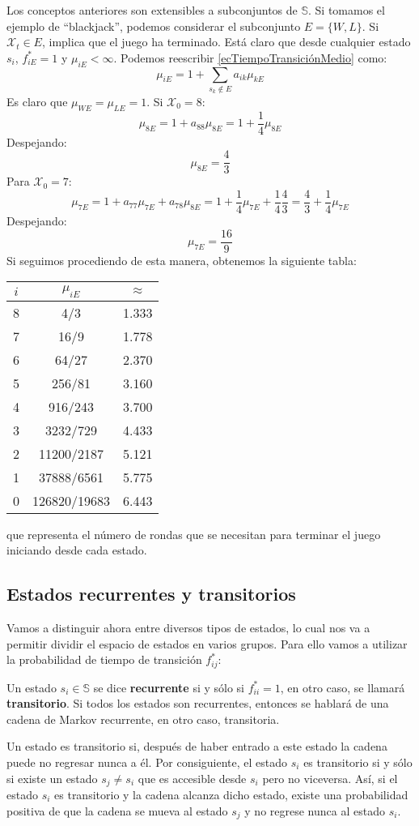 Los conceptos anteriores son extensibles a subconjuntos de $\mathbb{S}$. Si tomamos el ejemplo de \enquote{blackjack}, podemos considerar el subconjunto $E=\{W,L\}$. Si $\mathcal{X}_t\in E$, implica que el juego ha terminado. Está claro que desde cualquier estado $s_i$, $f_{iE}^*=1$ y $\mu_{iE}<\infty$. Podemos reescribir \eqref{ecTiempoTransiciónMedio} como:
\[\mu_{iE}=1+\sum_{s_k\notin E}a_{ik}\mu_{kE}\]
Es claro que $\mu_{WE}=\mu_{LE}=1$. Si $\mathcal{X}_0=8$:
\[\mu_{8E}=1+a_{88}\mu_{8E}=1+\dfrac{1}{4}\mu_{8E}\]
Despejando:
\[\mu_{8E}=\dfrac{4}{3}\]
Para $\mathcal{X}_0=7$:
\[\mu_{7E}=1+a_{77}\mu_{7E}+a_{78}\mu_{8E}=1+\dfrac{1}{4}\mu_{7E}+\dfrac{1}{4}\dfrac{4}{3}=\dfrac{4}{3}+\dfrac{1}{4}\mu_{7E}\]
Despejando:
\[\mu_{7E}=\dfrac{16}{9}\]
Si seguimos procediendo de esta manera, obtenemos la siguiente tabla:
\begin{center}
    \begin{tabular}{|c|c|c|}
        \hline
        $i$ & $\mu_{iE}$ & $\approx$  \\
        \hline   
        8 & 4/3 & 1.333 \\
        \hline
        7 & 16/9 & 1.778 \\
        \hline
        6 & 64/27 & 2.370\\
        \hline
        5 & 256/81 & 3.160 \\
        \hline
        4 & 916/243 & 3.700\\
        \hline
        3 & 3232/729 & 4.433\\
        \hline
        2 & 11200/2187 & 5.121\\
        \hline
        1 & 37888/6561 & 5.775\\
        \hline
        0 & 126820/19683 & 6.443\\
        \hline
    \end{tabular}
\end{center} 
que representa el número de rondas que se necesitan para terminar el juego iniciando desde cada estado.


\subsection{Estados recurrentes y transitorios}
Vamos a distinguir ahora entre diversos tipos de estados, lo cual nos va a permitir dividir el espacio de estados en varios grupos. Para ello vamos a utilizar la probabilidad de tiempo de transición $f_{ij}^*$:
\begin{definition}
Un estado $s_i\in\mathbb{S}$ se dice \textbf{recurrente} si y sólo si $f_{ii}^*=1$, en otro caso, se llamará \textbf{transitorio}. Si todos los estados son recurrentes, entonces se hablará de una cadena de Markov recurrente, en otro caso, transitoria.
\end{definition}
Un estado es transitorio si, después de haber entrado a este estado la cadena puede no regresar nunca a él. Por consiguiente, el estado $s_i$ es transitorio si y sólo si existe un estado $s_j\neq s_i$ que es accesible desde $s_i$ pero no viceversa. Así, si el estado $s_i$ es transitorio y la cadena alcanza dicho estado, existe una probabilidad positiva de que la cadena se mueva al estado $s_j$ y no regrese nunca al estado $s_i$.

